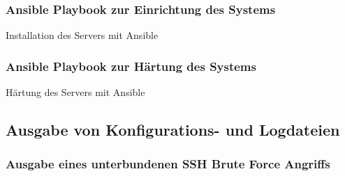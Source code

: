 \subsubsection{Ansible Playbook zur Einrichtung des Systems}
\begin{longlisting}
    \caption{Installation des Servers mit Ansible}
    \label{listing:ansible_playbook}
\end{longlisting}

\subsubsection{Ansible Playbook zur Härtung des Systems}
\begin{longlisting}
    \caption{Härtung des Servers mit Ansible}
    \label{listing:hardening}
\end{longlisting}

\subsection{Ausgabe von Konfigurations- und Logdateien}

\subsubsection{Ausgabe eines unterbundenen SSH Brute Force Angriffs}
\inputminted[breaklines=true,firstline=34, lastline=42]{text}{code/output/sshguard.txt}\label{listing:sshguard_log}
